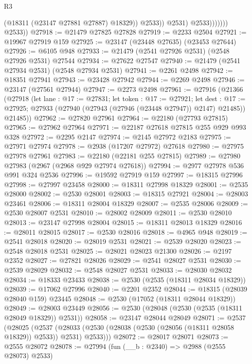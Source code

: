 \begin{lexlean}{R3}
\begin{coremodule}
                              (@18311 (@23147 @27881 @27887) @18329))
                            @2533))
                        @2531)
                      @2533)))))))
        @2533))
@27918 := @21479 @27825 @27828
@27919 := @2233 @2504
@27921 := @19967 @27919 @159
@27925 := @23147 (@23448 @27635) (@23453 @27644)
@27926 := @6105 @948
@27933 := @21479 (@2541 @27926 @2531) (@2548 @27926 @2531) @27544
@27934 := @27622 @27547
@27940 := @21479 (@2541 @27934 @2531) (@2548 @27934 @2531)
@27941 := @2261 @2498
@27942 := @18351 @27941
@27943 := @23428 @27942
@27944 := @2269 @2498
@27946 := @23147 (@27561 @27944)
@27947 := @2273 @2498
@27961 := @27916
    (@21366
      (@27918
        (let lane : @17 := @27831;
        let token : @17 := @27921;
        let dest : @17 := @27925; @27933 (@27940 (@27943 (@27946 (@23448 @27947)) @2147) @21485))
        @21485))
@27962 := @27820 @27961
@27964 := @22180 (@27793 @27815)
@27965 := @27962 @27964
@27971 := @22187 @27618 @27815 @255 @929 @993 @328
@27972 := @2295 @2147
@27974 := @2145 @27972 @2183
@27975 := @27971 @27974
@27978 := @2938 (@17207 @27972) @27618
@27980 := @27975 @27978 @27961
@27983 := @22180 (@22181 @255 @27815)
@27989 := @27980 @27983 (@2967 (@2968 @929 @27974 @27618))
@27994 := @2977 @27978 @536 @991 @324 @2536
@27996 := @19592 @27919 @159
@27997 := @18315 @27996
@27998 := @27997 @23458
@28000 := @18311 @27998 @18329
@28001 := @2535 @28000
@28002 := @2530 @28001
@28003 := @18315 @27921
@28004 := @28003 @23461
@28006 := @18311 @28004 @18329
@28007 := @2535 @28006
@28009 := @2530 @28007 @2531
@28010 := @28002 @28009
@28011 := @2530 @28010
@28013 := @23147 @27998 @28004
@28015 := @18311 @28013 @18329
@28016 := @28011 @28015
@28017 := @2530 @28016
@28018 := @4965 @948
@28019 := @2541 @28018
@28020 := @28019 @2531
@28021 := @2539 @28020
@28023 := @2548 @28018 @2531
@28025 := @28021 @28023 @21300
@28026 := @2197 @2352
@28027 := @27821 @28026
@28029 := @2541 @28027 @2531
@28030 := @2539 @28029
@28032 := @2548 @28027 @2531
@28033 := @28030 @28032
@28034 := @18333 @23433
@28038 := @2530 (@2535 (@18311 @28034 @18329))
@28039 := @17062 @27996
@28040 := @2201 @2352
@28044 := @18315 (@28039 @28040 @159) @23445
@28048 := @2530 (@17052 (@18311 @28044 @18329))
@28049 := @28003 @23449
@28056 := @2530 (@28048 (@2530 (@2535 (@18311 @28049 @18329)) @2531))
@28058 := @23147 @28044 @28049
@28071 := @2537
    (@28025
      (@2537 (@28033 (@2530 (@28038 (@2530 (@28056 (@18311 @28058 @18329)) @2533)) @2531) @2533)))
@28072 := @28017 @28071
@28073 := @2555 @28072
@28078 := @27994 (fun (__b : @2340) => @2988 (@2555 @28073) @2533)

\end{coremodule}
\end{lexlean}
